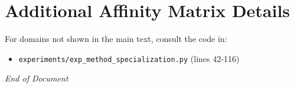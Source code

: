 \documentclass[11pt,a4paper]{article}
\theoremstyle{definition}
\theoremstyle{plain}
\begin{document}
\section{Additional Affinity Matrix Details}

For domains not shown in the main text, consult the code in:
\begin{itemize}
    \item \texttt{experiments/exp\_method\_specialization.py} (lines 42-116)
\end{itemize}

\newpage





\vspace{2cm}
\begin{center}
\textit{End of Document}
\end{center}
\end{document}
